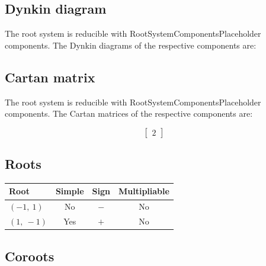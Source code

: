 \documentclass[11pt]{article}
\theoremstyle{definition}
\newif\ifrootsystemirreducible
\begin{document}
\subsection{Dynkin diagram}

\ifrootsystemirreducible
The root system is irreducible and has Dynkin diagram:
\else
The root system is reducible with RootSystemComponentsPlaceholder components. The Dynkin diagrams of the respective components are:
\fi


\subsection{Cartan matrix}

\ifrootsystemirreducible
The root system is irreducible and has Cartan matrix:
\else
The root system is reducible with RootSystemComponentsPlaceholder components. The Cartan matrices of the respective components are:
\fi

\[
\left[\begin{matrix}2\end{matrix}\right]
\]

\subsection{Roots}

\begin{tabular}{|l|c|c|c|}
    \hline
    \textbf{Root} & \textbf{Simple} & \textbf{Sign} & \textbf{Multipliable} \\
    \hline
    $\left( -1, \  1\right)$ & No & $-$ & No \\
    \hline
    $\left( 1, \  -1\right)$ & Yes & $+$ & No \\
    \hline
\end{tabular}


\subsection{Coroots}
\end{document}
